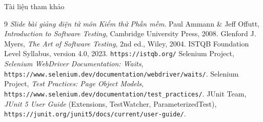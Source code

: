 \documentclass[aspectratio=169,12pt]{beamer}
\begin{document}
\begin{frame}{Tài liệu tham khảo}
  \vspace*{-0.4em}
  \footnotesize
  \begin{thebibliography}{9}
      \textit{Slide bài giảng điện tử môn Kiểm thử Phần mềm}.
     Paul Ammann \& Jeff Offutt,
      \textit{Introduction to Software Testing},
      Cambridge University Press, 2008.
     Glenford J. Myers,
      \textit{The Art of Software Testing}, 2nd ed., Wiley, 2004.
     ISTQB Foundation Level Syllabus, version 4.0, 2023.
      \texttt{https://istqb.org/}
     Selenium Project,
      \textit{Selenium WebDriver Documentation: Waits},
      \texttt{https://www.selenium.dev/documentation/webdriver/waits/}.
     Selenium Project,
      \textit{Test Practices: Page Object Models},
      \texttt{https://www.selenium.dev/documentation/test\_practices/}.
     JUnit Team, \textit{JUnit 5 User Guide}
      (Extensions, TestWatcher, ParameterizedTest),
      \texttt{https://junit.org/junit5/docs/current/user-guide/}.
  \end{thebibliography}
\end{frame}
\end{document}
